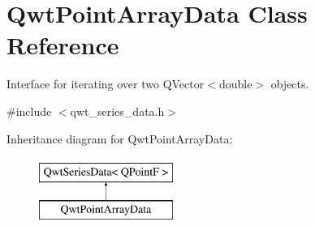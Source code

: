 \hypertarget{class_qwt_point_array_data}{\section{Qwt\-Point\-Array\-Data Class Reference}
\label{class_qwt_point_array_data}
}


Interface for iterating over two Q\-Vector$<$double$>$ objects.  




{\ttfamily \#include $<$qwt\-\_\-series\-\_\-data.\-h$>$}

Inheritance diagram for Qwt\-Point\-Array\-Data\-:\begin{figure}[H]
\begin{center}
\leavevmode
\includegraphics[height=2.000000cm]{class_qwt_point_array_data}
\end{center}
\end{figure}
